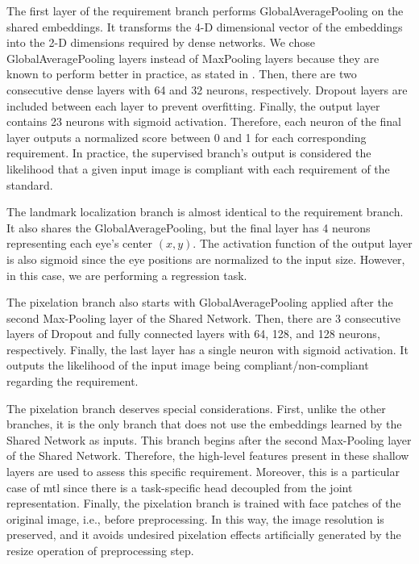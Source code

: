 The first layer of the requirement branch performs GlobalAveragePooling on the shared embeddings. It transforms the 4-D dimensional vector of the embeddings into the 2-D dimensions required by dense networks. We chose GlobalAveragePooling layers instead of MaxPooling layers because they are known to perform better in practice, as stated in \cite{zhou2016learning}. Then, there are two consecutive dense layers with 64 and 32 neurons, respectively. Dropout layers are included between each layer to prevent overfitting. Finally, the output layer contains 23 neurons with sigmoid activation. Therefore, each neuron of the final layer outputs a normalized score between 0 and 1 for each corresponding requirement. In practice, the supervised branch's output is considered the likelihood that a given input image is compliant with each requirement of the \icao standard.
 
The landmark localization branch is almost identical to the requirement branch. It also shares the GlobalAveragePooling, but the final layer has 4 neurons representing each eye's center $(x, y)$. The activation function of the output layer is also sigmoid since the eye positions are normalized to the input size. However, in this case, we are performing a regression task.
 
The pixelation branch also starts with GlobalAveragePooling applied after the second Max-Pooling layer of the Shared Network. Then, there are 3 consecutive layers of Dropout and fully connected layers with 64, 128, and 128 neurons, respectively. Finally, the last layer has a single neuron with sigmoid activation. It outputs the likelihood of the input image being compliant/non-compliant regarding the \pixelation requirement.
 
The pixelation branch deserves special considerations. First, unlike the other branches, it is the only branch that does not use the embeddings learned by the Shared Network as inputs. This branch begins after the second Max-Pooling layer of the Shared Network. Therefore, the high-level features present in these shallow layers are used to assess this specific requirement. Moreover, this is a particular case of \acl{mtl} since there is a task-specific head decoupled from the joint representation. Finally, the pixelation branch is trained with face patches of the original image, i.e., before preprocessing. In this way, the image resolution is preserved, and it avoids undesired pixelation effects artificially generated by the resize operation of preprocessing step. 
 
